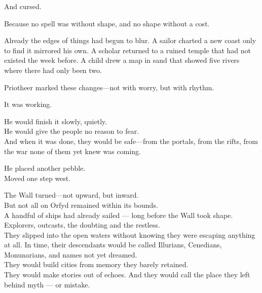 \documentclass[12pt]{article}
\begin{document}
\vspace{0.5em}
And cursed.

\vspace{0.5em}
Because no spell was without shape, and no shape without a cost.

\vspace{0.5em}
Already the edges of things had begun to blur. A sailor charted a new coast only to find it mirrored his own. A scholar returned to a ruined temple that had not existed the week before. A child drew a map in sand that showed five rivers where there had only been two.

\vspace{0.5em}
Priotheer marked these changes---not with worry, but with rhythm.

\vspace{0.5em}
It was working.

\vspace{0.5em}
He would finish it slowly, quietly.\\
He would give the people no reason to fear.\\
And when it was done, they would be safe---from the portals, from the rifts, from the war none of them yet knew was coming.

\vspace{0.5em}
He placed another pebble.\\
Moved one step west.

\vspace{0.5em}
The Wall turned---not upward, but inward.\\

But not all on Orfyd remained within its bounds.\\

A handful of ships had already sailed — long before the Wall took shape.\\

Explorers, outcasts, the doubting and the restless.\\

They slipped into the open waters without knowing they were escaping anything at all.
In time, their descendants would be called Illurians, Cenedians, Monunarians, and names not yet dreamed.\\

They would build cities from memory they barely retained.\\

They would make stories out of echoes.
And they would call the place they left behind myth — or mistake.\\
\end{document}
